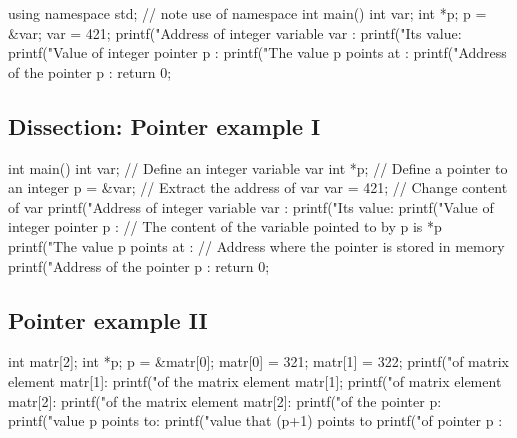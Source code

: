 \documentclass[%
twoside,                 %
final,                   %
10pt]{article}
\newenvironment{block_mdfboxadmon}[1][]{
\begin{block_mdfboxmdframed}[frametitle=#1]
}
{
\end{block_mdfboxmdframed}
}
\begin{document}
\begin{block_mdfboxadmon}[]
\bcppcod
using namespace std; // note use of namespace
int main()
{
  int var;
  int *p;
  p = &var;
  var  = 421;
  printf("Address of integer variable var : %
  printf("Its value: %
  printf("Value of integer pointer p : %
  printf("The value p points at :  %
  printf("Address of the pointer p : %
  return 0;
}
\ecppcod
\end{block_mdfboxadmon}



\subsection{Dissection: Pointer example I}


\begin{block_mdfboxadmon}[Discussion.]

\bcppcod
int main()
{
  int var;     // Define an integer variable var
  int *p;      // Define a pointer to an integer
  p = &var;    // Extract the address of var
  var = 421;   // Change content of var
  printf("Address of integer variable var : %
  printf("Its value: %
  printf("Value of integer pointer p : %
  // The content of the variable pointed to by p is *p
  printf("The value p points at :  %
  // Address where the pointer is stored in memory
  printf("Address of the pointer p : %
  return 0;
}
\ecppcod
\end{block_mdfboxadmon}



\subsection{Pointer example II}


\begin{block_mdfboxadmon}[]
\bcppcod
int matr[2];
int *p;
p = &matr[0];
matr[0] = 321;
matr[1] = 322;
printf("\nAddress of matrix element matr[1]: %
printf("\nValue of the  matrix element  matr[1]; %
printf("\nAddress of matrix element matr[2]: %
printf("\nValue of the matrix element  matr[2]: %
printf("\nValue of the pointer p: %
printf("\nThe value p points to: %
printf("\nThe value that (p+1) points to  %
printf("\nAddress of pointer p : %
\ecppcod
\end{block_mdfboxadmon}
\end{document}
